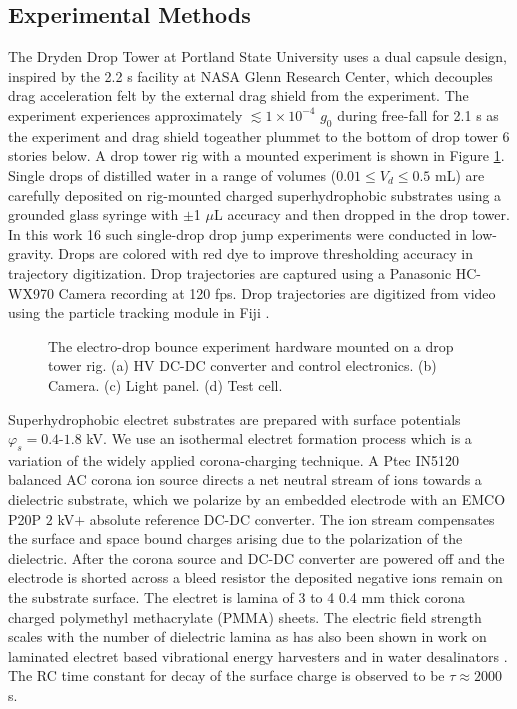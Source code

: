 \documentclass[aip,reprint, floatfix]{revtex4-1}
\begin{document}
\subsection{Experimental Methods}
The Dryden Drop Tower at Portland State University uses a dual capsule design, inspired by the 2.2 s facility at NASA Glenn Research Center, which decouples drag acceleration felt by the external drag shield from the experiment. The experiment experiences approximately $\lesssim 1 \times 10^{-4}$ $g_0$ during free-fall for 2.1 s as the experiment and drag shield togeather plummet to the bottom of drop tower 6 stories below. A drop tower rig with a mounted experiment is shown in Figure \ref{fig:rig}. Single drops of distilled water in a range of volumes ($0.01 \leq V_d \leq 0.5$ mL) are carefully deposited on rig-mounted charged superhydrophobic substrates using a grounded glass syringe with $\pm $1 $\mu$L accuracy and then dropped in the drop tower. In this work 16 such single-drop drop jump experiments were conducted in low-gravity. Drops are colored with red dye to improve thresholding accuracy in trajectory digitization. Drop trajectories are captured using a Panasonic HC-WX970 Camera recording at 120 fps. Drop trajectories are digitized from video using the particle tracking module in Fiji \cite{schindelin_fiji:_2012}.

\begin{figure}
    \centering
    \fontsize{12pt}{13pt}\selectfont
    \def\svgwidth{\columnwidth}
    \caption{The electro-drop bounce experiment hardware mounted on a drop tower rig. (a) HV DC-DC converter and control electronics. (b) Camera. (c) Light panel. (d) Test cell. \label{fig:rig}}
\end{figure}

Superhydrophobic electret substrates are prepared with surface potentials $\varphi_s = 0.4$-$1.8$ kV. We use an isothermal electret formation process which is a variation of the widely applied corona-charging technique. A Ptec IN5120 balanced AC corona ion source directs a net neutral stream of ions towards a dielectric substrate, which we polarize by an embedded electrode with an EMCO P20P $2$ kV$+$ absolute reference DC-DC converter. The ion stream compensates the surface and space bound charges arising due to the polarization of the dielectric. After the corona source and DC-DC converter are powered off and the electrode is shorted across a bleed resistor the deposited negative ions remain on the substrate surface. The electret is lamina of 3 to 4 0.4 mm thick corona charged polymethyl methacrylate (PMMA) sheets. The electric field strength scales with the number of dielectric lamina as has also been shown in work on laminated electret based vibrational energy harvesters \cite{wada_stacking_2012} and in water desalinators \cite{ni_desalination_2005}. The RC time constant for decay of the surface charge is observed to be $\tau \approx 2000$ s.
\end{document}
